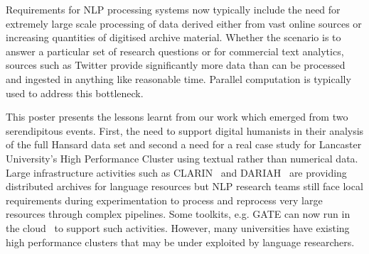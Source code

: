 

Requirements for NLP processing systems now typically include the need for extremely large scale processing of data derived either from vast online sources or increasing quantities of digitised archive material. 
Whether the scenario is to answer a particular set of research questions or for commercial text analytics, sources such as Twitter provide significantly more data than can be processed and ingested in anything like reasonable time. Parallel computation is typically used to address this bottleneck. 


This poster presents the lessons learnt from our work which emerged from two serendipitous events. First, the need to support digital humanists in their analysis of the full Hansard data set and second a need for a real case study for Lancaster University's High Performance Cluster using textual rather than numerical data. Large infrastructure activities such as CLARIN~\cite{varadi2008clarin} and DARIAH~\cite{constantopoulos2008preparing} are providing distributed archives for language resources but NLP research teams still face local requirements during experimentation to process and reprocess very large resources through complex pipelines. Some toolkits, e.g. GATE can now run in the cloud~\cite{tablan2013gatecloud} to support such activities. However, many universities have existing high performance clusters that may be under exploited by language researchers. 

